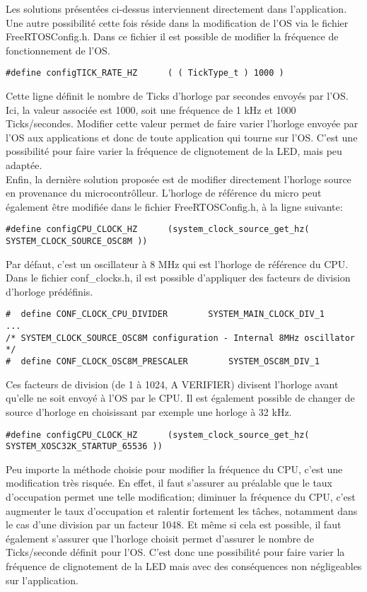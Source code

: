 Les solutions présentées ci-dessus interviennent directement dans l'application.
Une autre possibilité cette fois réside dans la modification de l'OS via le fichier FreeRTOSConfig.h.
Dans ce fichier il est possible de modifier la fréquence de fonctionnement de l'OS.

\begin{lstlisting}[style=CStyle]
#define configTICK_RATE_HZ		( ( TickType_t ) 1000 )
\end{lstlisting}

Cette ligne définit le nombre de Ticks d'horloge par secondes envoyés par l'OS.
Ici, la valeur associée est 1000, soit une fréquence de 1 kHz et 1000 Ticks/secondes.
Modifier cette valeur permet de faire varier l'horloge envoyée par l'OS aux applications et donc de toute application qui tourne sur l'OS.
C'est une possibilité pour faire varier la fréquence de clignotement de la LED, mais peu adaptée.\\

Enfin, la dernière solution proposée est de modifier directement l'horloge source en provenance du microcontrôlleur.
L'horloge de référence du micro peut également être modifiée dans le fichier FreeRTOSConfig.h, à la ligne suivante:

\begin{lstlisting}[style=CStyle]
#define configCPU_CLOCK_HZ		(system_clock_source_get_hz( SYSTEM_CLOCK_SOURCE_OSC8M ))
\end{lstlisting}

Par défaut, c'est un oscillateur à 8 MHz qui est l'horloge de référence du CPU.
Dans le fichier conf\_clocks.h, il est possible d'appliquer des facteurs de division d'horloge prédéfinis.

\begin{lstlisting}[style=CStyle]
#  define CONF_CLOCK_CPU_DIVIDER		SYSTEM_MAIN_CLOCK_DIV_1
...
/* SYSTEM_CLOCK_SOURCE_OSC8M configuration - Internal 8MHz oscillator */
#  define CONF_CLOCK_OSC8M_PRESCALER		SYSTEM_OSC8M_DIV_1

\end{lstlisting}

Ces facteurs de division (de 1 à 1024, A VERIFIER) divisent l'horloge avant qu'elle ne soit envoyé à l'OS par le CPU.
Il est également possible de changer de source d'horloge en choisissant par exemple une horloge à 32 kHz.

\begin{lstlisting}[style=CStyle]
#define configCPU_CLOCK_HZ		(system_clock_source_get_hz( SYSTEM_XOSC32K_STARTUP_65536 ))
\end{lstlisting}

Peu importe la méthode choisie pour modifier la fréquence du CPU, c'est une modification très risquée.
En effet, il faut s'assurer au préalable que le taux d'occupation permet une telle modification; diminuer la fréquence du CPU, c'est augmenter le taux d'occupation et ralentir fortement les tâches, notamment dans le cas d'une division par un facteur 1048.
Et même si cela est possible, il faut également s'assurer que l'horloge choisit permet d'assurer le nombre de Ticks/seconde définit pour l'OS.
C'est donc une possibilité pour faire varier la fréquence de clignotement de la LED mais avec des conséquences non négligeables sur l'application.